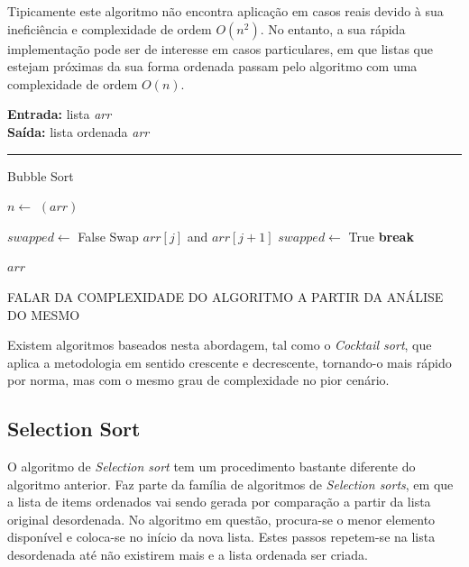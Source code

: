 \documentclass[conference]{IEEEtran}
\begin{document}
Tipicamente este algoritmo não encontra aplicação em casos reais devido à sua ineficiência e complexidade de ordem \(O(n^2)\). No entanto, a sua rápida implementação pode ser de interesse em casos particulares, em que listas que estejam próximas da sua forma ordenada passam pelo algoritmo com uma complexidade de ordem \(O(n)\).

\begin{algorithm}[H]
    \raggedright
    \vspace{.1em}
    \textbf{Entrada:} lista \textit{arr} \\
    \textbf{Saída:} lista ordenada \textit{arr} \\
    \vspace{.5em}
    \hrule 
    \caption{Bubble Sort}
    \begin{algorithmic}[1]
        \State $n \gets$ $(arr)$
        
            \State $swapped \gets$ False
                    \State Swap $arr[j]$ and $arr[j+1]$
                    \State $swapped \gets$ True
                \EndIf
            \EndFor
                \State \textbf{break}
            \EndIf
        \EndFor
    
        \State \Return $arr$
    \end{algorithmic}
\end{algorithm}

FALAR DA COMPLEXIDADE DO ALGORITMO A PARTIR DA ANÁLISE DO MESMO

Existem algoritmos baseados nesta abordagem, tal como o \textit{Cocktail sort}, que aplica a metodologia em sentido crescente e decrescente, tornando-o mais rápido por norma, mas com o mesmo grau de complexidade no pior cenário.

\subsection{Selection Sort}

O algoritmo de \textit{Selection sort} tem um procedimento bastante diferente do algoritmo anterior. Faz parte da família de algoritmos de \textit{Selection sorts}, em que a lista de items ordenados vai sendo gerada por comparação a partir da lista original desordenada. No algoritmo em questão, procura-se o menor elemento disponível e coloca-se no início da nova lista. Estes passos repetem-se na lista desordenada até não existirem mais e a lista ordenada ser criada.
\end{document}
